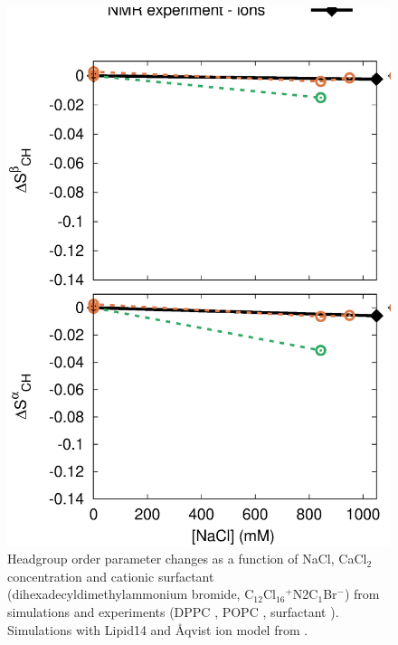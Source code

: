 \documentclass[aip,jcp,twocolumn]{revtex4}
\begin{document}
{\begin{figure}[]
  \centering
  \includegraphics[width=16.0cm]{../Fig/OrdParChanges_NaCl_CaCl2_surf.eps}
  \caption{\label{OrderParameterCHANGESnewMODELS}
    Headgroup order parameter changes as a function of NaCl, CaCl$_2$ concentration and
    cationic surfactant (dihexadecyldimethylammonium bromide, C$_{12}$Cl$_{16}$$^+$N2C$_1$Br$^-$)
    from simulations and experiments (DPPC \cite{akutsu81}, POPC \cite{altenbach84}, surfactant \cite{scherer89}).
    Simulations with Lipid14 and Åqvist ion model from \cite{catte16,lipid14POPC0mMNaClfiles,lipid14POPC350mMCaClfiles,lipid14POPC1000mMCaClfiles}.
  }
\end{figure}

}
\end{document}
